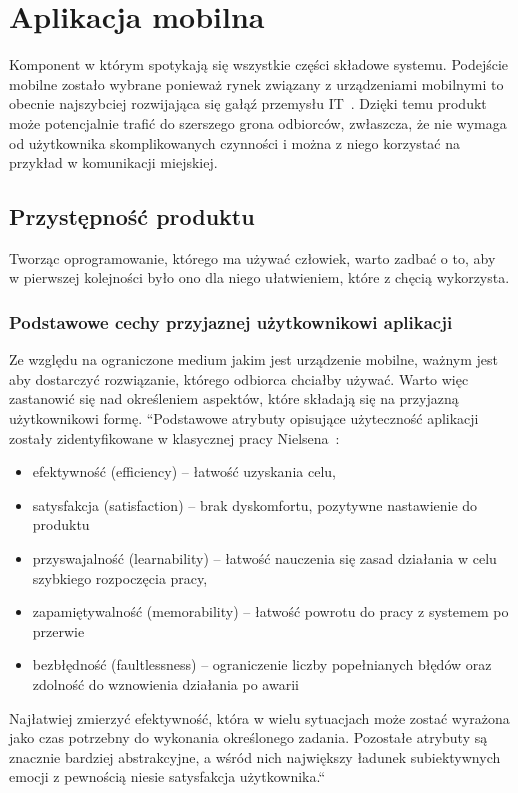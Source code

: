 \section{Aplikacja mobilna}
Komponent w którym spotykają się wszystkie części składowe systemu. Podejście mobilne zostało wybrane ponieważ rynek związany z urządzeniami mobilnymi to obecnie najszybciej rozwijająca się gałąź przemysłu IT~\cite{mobile}. Dzięki temu produkt może potencjalnie trafić do szerszego grona odbiorców, zwłaszcza, że nie wymaga od użytkownika skomplikowanych czynności i można z niego korzystać na przykład w komunikacji miejskiej.

\subsection{Przystępność produktu}
Tworząc oprogramowanie, którego ma używać człowiek, warto zadbać o to, aby\\w pierwszej kolejności było ono dla niego ułatwieniem, które z chęcią wykorzysta.
\subsubsection{Podstawowe cechy przyjaznej użytkownikowi aplikacji}
 Ze względu na ograniczone medium jakim jest urządzenie mobilne, ważnym jest aby dostarczyć rozwiązanie, którego odbiorca chciałby używać. Warto więc zastanowić się nad określeniem aspektów, które składają się na przyjazną użytkownikowi formę.\newline
 ``Podstawowe atrybuty opisujące użyteczność aplikacji zostały zidentyfikowane w klasycznej pracy Nielsena~\cite{usability}: 
 \begin{itemize}
	 \item efektywność (efficiency) – łatwość uzyskania celu,
	 \item satysfakcja (satisfaction) – brak dyskomfortu, pozytywne nastawienie do
	 produktu
	 \item przyswajalność (learnability) – łatwość nauczenia się zasad działania w celu szybkiego rozpoczęcia pracy,
	 \item zapamiętywalność (memorability) – łatwość powrotu do pracy z systemem
	 po przerwie
	 \item bezbłędność (faultlessness) – ograniczenie liczby popełnianych błędów oraz zdolność do wznowienia działania po awarii
 \end{itemize}
 Najłatwiej zmierzyć efektywność, która w wielu sytuacjach może zostać
 wyrażona jako czas potrzebny do wykonania określonego zadania. Pozostałe
 atrybuty są znacznie bardziej abstrakcyjne, a wśród nich największy ładunek
 subiektywnych emocji z pewnością niesie satysfakcja użytkownika.``~\cite{mobile}

